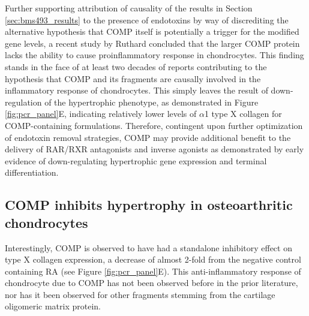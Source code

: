 \begin{refsection}
Further supporting attribution of causality of the results in Section
\ref{sec:bms493_results} to the presence of endotoxins by way of discrediting
the alternative hypothesis that COMP itself is potentially a trigger for the
modified gene levels, a recent study by Ruthard  concluded that
the larger COMP protein lacks the ability to cause proinflammatory response in
chondrocytes.\cite{Ruthard2014} This finding stands in the face of at least two
decades of reports contributing to the hypothesis that COMP and its fragments
are causally involved in the inflammatory response of
chondrocytes.\cite{Lohmander1994,Vilim1997,Heinegard2011,Adams2001,Vilim2002}
This simply leaves the result of down-regulation of the hypertrophic phenotype,
as demonstrated in Figure \ref{fig:pcr_panel}E, indicating relatively lower
levels of ${\alpha}$1 type X collagen for COMP-containing formulations.
Therefore, contingent upon further optimization of endotoxin removal strategies,
COMP may provide additional benefit to the delivery of RAR/RXR
antagonists and inverse agonists as demonstrated by early evidence of
down-regulating hypertrophic gene expression and terminal differentiation.

\subsection{COMP inhibits hypertrophy in osteoarthritic chondrocytes}
Interestingly, COMP is observed to have had a standalone inhibitory effect on
type X collagen expression, a decrease of almost 2-fold from the negative
control containing RA (see Figure \ref{fig:pcr_panel}E). This anti-inflammatory
response of chondrocyte due to COMP has not been observed before in the prior
literature, nor has it been observed for other fragments stemming from the
cartilage oligomeric matrix protein.


\end{refsection}
